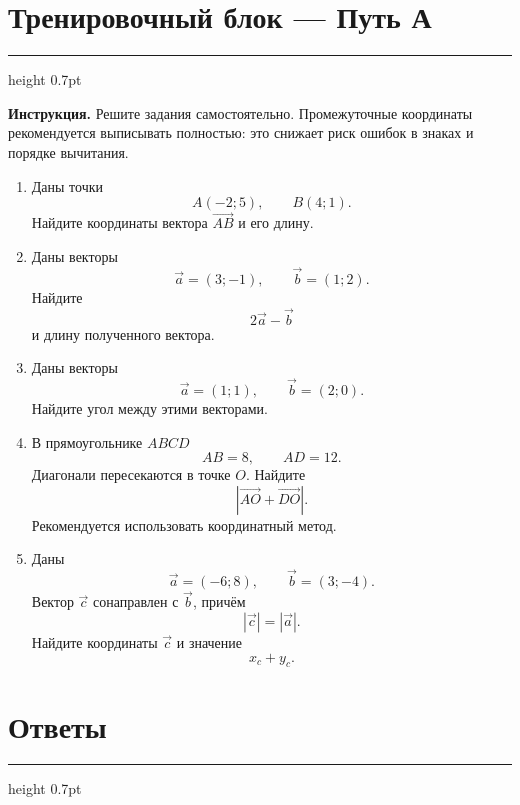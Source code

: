 \documentclass[a4paper,12pt]{article}
\newcommand{\vect}[1]{\vec{#1}}
\newcommand{\sectionrule}{%
  \par\vspace{1mm}%
  {\color{accent!60}\hrule height 0.7pt}%
  \vspace{3mm}%
}
\begin{document}
\clearpage


\section*{Тренировочный блок --- Путь А}
\sectionrule

\textbf{Инструкция.}
Решите задания самостоятельно. Промежуточные координаты рекомендуется выписывать полностью:
это снижает риск ошибок в знаках и порядке вычитания.

\begin{enumerate}[leftmargin=8mm,label=\textbf{\arabic*.},itemsep=8mm]

\item
Даны точки
\[
A(-2;5),
\qquad
B(4;1).
\]
Найдите координаты вектора \(\overrightarrow{AB}\) и его длину.

\item
Даны векторы
\[
\vect a=(3;-1),
\qquad
\vect b=(1;2).
\]
Найдите
\[
2\vect a-\vect b
\]
и длину полученного вектора.

\item
Даны векторы
\[
\vect a=(1;1),
\qquad
\vect b=(2;0).
\]
Найдите угол между этими векторами.

\item
В прямоугольнике \(ABCD\)
\[
AB=8,
\qquad
AD=12.
\]
Диагонали пересекаются в точке \(O\).
Найдите
\[
\left|
\overrightarrow{AO}+\overrightarrow{DO}
\right|.
\]
Рекомендуется использовать координатный метод.

\item
Даны
\[
\vect a=(-6;8),
\qquad
\vect b=(3;-4).
\]
Вектор \(\vect c\) сонаправлен с \(\vect b\), причём
\[
|\vect c|=|\vect a|.
\]
Найдите координаты \(\vect c\) и значение
\[
x_c+y_c.
\]

\end{enumerate}


\clearpage

\section*{Ответы}
\sectionrule
\end{document}

